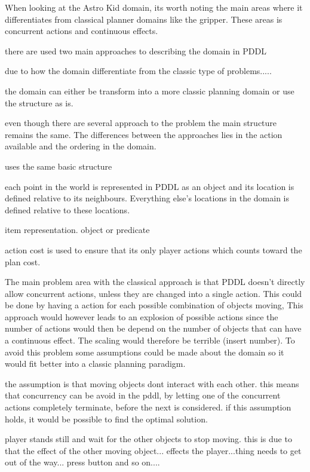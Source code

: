 	
		
	When looking at the Astro Kid domain, its worth noting the main areas where it differentiates from classical planner domains like the gripper. These areas is concurrent actions and continuous effects. 
	
	
	there are used two main approaches to describing the domain in PDDL
		
	due to how the domain differentiate from the classic type of problems.....
	
	the domain can either be transform into a more classic planning domain or use the structure as is.
	
		even though there are several approach to the problem the main structure remains the same. The differences between the approaches lies in the action available and the ordering in the domain. 
		
		uses the same basic structure
		
		each point in the world is represented in PDDL as an object and its location is defined relative to its neighbours. Everything else's locations in the domain is defined relative to these locations.
		
		item representation. object or predicate
		
		
		action cost is used to ensure that its only player actions which counts toward the plan cost.
		
		
		
	
		The main problem area with the classical approach is that PDDL doesn't directly allow concurrent actions, unless they are changed into a single action. This could be done by having a action for each possible combination of objects moving, This approach would however leads to an explosion of possible actions since the number of actions would then be depend on the number of objects that can have a continuous effect. The scaling would therefore be terrible (insert number). To avoid this problem some assumptions could be made about the domain so it would fit better into a classic planning paradigm. 
		
		the assumption is that moving objects dont interact with each other. this means that concurrency can be avoid in the pddl, by letting one of the concurrent actions completely terminate, before the next is considered. if this assumption holds, it would be possible to find the optimal solution.
		
		player stands still and wait for the other objects to stop moving. this is due to that the effect of the other moving object... effects the player...thing needs to get out of the way... press button and so on.... 
		
